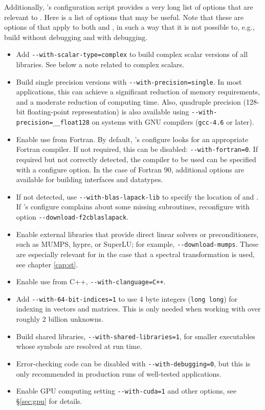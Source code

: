 Additionally, \petsc's configuration script provides a very long list of options that are relevant to \slepc. Here is a list of options that may be useful. Note that these are options of \petsc that apply to both \petsc and \slepc, in such a way that it is not possible to, e.g., build \petsc without debugging and \slepc with debugging.
\begin{itemize}
\item Add \Verb!--with-scalar-type=complex! to build complex scalar versions of all libraries. See below a note related to complex scalars.
\item Build single precision versions with \Verb!--with-precision=single!. In most applications, this can achieve a significant reduction of memory requirements, and a moderate reduction of computing time. Also, quadruple precision (128-bit floating-point representation) is also available using \Verb!--with-precision=__float128! on systems with GNU compilers (\texttt{gcc-4.6} or later).
\item Enable use from Fortran. By default, \petsc's configure looks for an appropriate Fortran compiler. If not required, this can be disabled: \Verb!--with-fortran=0!. If required but not correctly detected, the compiler to be used can be specified with a configure option. In the case of Fortran 90, additional options are available for building interfaces and datatypes.
\item If not detected, use \Verb!--with-blas-lapack-lib! to specify the location of \blas and \lapack. If \slepc's configure complains about some missing \lapack subroutines, reconfigure \petsc with option \Verb!--download-f2cblaslapack!.
\item Enable external libraries that provide direct linear solvers or preconditioners, such as MUMPS, hypre, or SuperLU; for example, \Verb!--download-mumps!. These are especially relevant for \slepc in the case that a spectral transformation is used, see chapter \ref{cap:st}.
\item Enable use from C++, \Verb!--with-clanguage=C++!.
\item Add \Verb!--with-64-bit-indices=1! to use 4 byte integers (\texttt{long long}) for indexing in vectors and matrices. This is only needed when working with over roughly 2 billion unknowns.
\item Build shared libraries, \Verb!--with-shared-libraries=1!, for smaller executables whose symbols are resolved at run time.
\item Error-checking code can be disabled with \Verb!--with-debugging=0!, but this is only recommended in production runs of well-tested applications.
\item Enable GPU computing setting \Verb!--with-cuda=1! and other options, see \S\ref{sec:gpu} for details.
\end{itemize}

